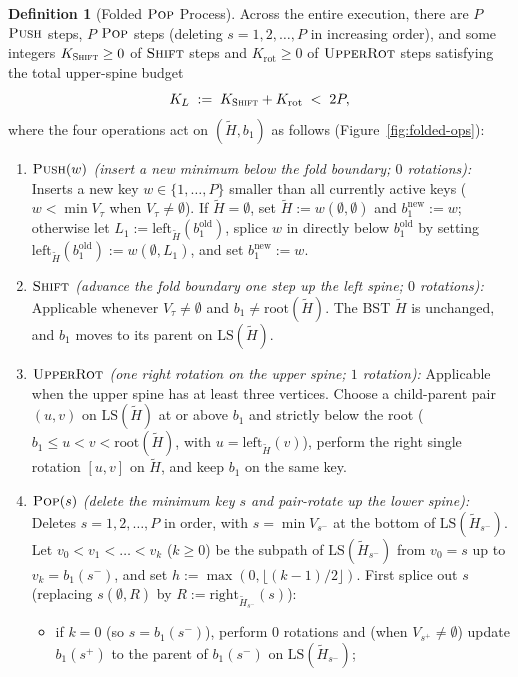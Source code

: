 \documentclass[11pt]{article}
\theoremstyle{definition}
\newtheorem{definition}[theorem]{Definition}
\theoremstyle{remark}
\newcommand{\LS}{\mathrm{LS}}
\newcommand{\PUSH}{\textnormal{\scshape Push}}
\newcommand{\POP}{\textnormal{\scshape Pop}}
\newcommand{\SHIFT}{\textnormal{\scshape Shift}}
\newcommand{\UPROT}{\textnormal{\scshape UpperRot}}
\begin{document}
\begin{definition}[Folded $\POP$ Process]
Across the entire execution, there are $P$ $\PUSH$ steps, $P$ $\POP$ steps (deleting $s = 1, 2, \dots, P$ in increasing order), and some integers $K_{\SHIFT} \ge 0$ of $\SHIFT$ steps and $K_{\mathrm{rot}} \ge 0$ of $\UPROT$ steps satisfying the total upper-spine budget
\[
K_L \;:=\; K_{\SHIFT} + K_{\mathrm{rot}} \;<\; 2P,
\]
where the four operations act on $(\widetilde{H}, b_1)$ as follows (Figure~\ref{fig:folded-ops}):
\begin{enumerate}[label=(\arabic*), leftmargin=2em, itemsep=2pt]
  \item \emph{$\PUSH(w)$ (insert a new minimum below the fold boundary; $0$ rotations):} Inserts a new key $w \in \{1, \dots, P\}$ smaller than all currently active keys ($w < \min V_\tau$ when $V_\tau \ne \emptyset$). If $\widetilde{H} = \emptyset$, set $\widetilde{H} := w(\emptyset, \emptyset)$ and $b_1^{\mathrm{new}} := w$; otherwise let $L_1 := \mathrm{left}_{\widetilde{H}}(b_1^{\mathrm{old}})$, splice $w$ in directly below $b_1^{\mathrm{old}}$ by setting $\mathrm{left}_{\widetilde{H}}(b_1^{\mathrm{old}}) := w(\emptyset, L_1)$, and set $b_1^{\mathrm{new}} := w$.
  \item \emph{$\SHIFT$ (advance the fold boundary one step up the left spine; $0$ rotations):} Applicable whenever $V_\tau \ne \emptyset$ and $b_1 \ne \mathrm{root}(\widetilde{H})$. The BST $\widetilde{H}$ is unchanged, and $b_1$ moves to its parent on $\LS(\widetilde{H})$.
  \item \emph{$\UPROT$ (one right rotation on the upper spine; $1$ rotation):} Applicable when the upper spine has at least three vertices. Choose a child-parent pair $(u, v)$ on $\LS(\widetilde{H})$ at or above $b_1$ and strictly below the root ($b_1 \le u < v < \mathrm{root}(\widetilde{H})$, with $u = \mathrm{left}_{\widetilde{H}}(v)$), perform the right single rotation $[u, v]$ on $\widetilde{H}$, and keep $b_1$ on the same key.
  \item \emph{$\POP(s)$ (delete the minimum key $s$ and pair-rotate up the lower spine):} Deletes $s = 1, 2, \dots, P$ in order, with $s = \min V_{s^-}$ at the bottom of $\LS(\widetilde{H}_{s^-})$. Let $v_0 < v_1 < \dots < v_k$ ($k \ge 0$) be the subpath of $\LS(\widetilde{H}_{s^-})$ from $v_0 = s$ up to $v_k = b_1(s^-)$, and set $h := \max(0, \lfloor (k - 1)/2 \rfloor)$. First splice out $s$ (replacing $s(\emptyset, R)$ by $R := \mathrm{right}_{\widetilde{H}_{s^-}}(s)$):
  \begin{itemize}[leftmargin=1.5em, itemsep=1pt, topsep=2pt]
    \item if $k = 0$ (so $s = b_1(s^-)$), perform $0$ rotations and (when $V_{s^+} \ne \emptyset$) update $b_1(s^+)$ to the parent of $b_1(s^-)$ on $\LS(\widetilde{H}_{s^-})$;

\end{itemize}
\end{enumerate}
\end{definition}
\end{document}
